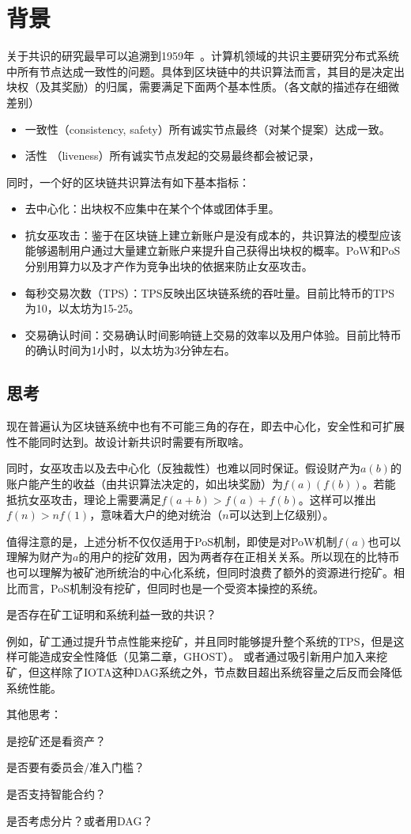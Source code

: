 \section{背景}
关于共识的研究最早可以追溯到1959年~\cite{eisenberg1959consensus}。计算机领域的共识主要研究分布式系统中所有节点达成一致性的问题。具体到区块链中的共识算法而言，其目的是决定出块权（及其奖励）的归属，需要满足下面两个基本性质。（各文献的描述存在细微差别）

\begin{itemize}
\item 一致性（consistency, safety）所有诚实节点最终（对某个提案）达成一致。
\item 活性 （liveness）所有诚实节点发起的交易最终都会被记录，
\end{itemize}
同时，一个好的区块链共识算法有如下基本指标：
\begin{itemize}
\item 去中心化：出块权不应集中在某个个体或团体手里。
\item 抗女巫攻击：鉴于在区块链上建立新账户是没有成本的，共识算法的模型应该能够遏制用户通过大量建立新账户来提升自己获得出块权的概率。PoW和PoS分别用算力以及才产作为竞争出块的依据来防止女巫攻击。
\item 每秒交易次数（TPS）：TPS反映出区块链系统的吞吐量。目前比特币的TPS为10，以太坊为15-25。
\item 交易确认时间：交易确认时间影响链上交易的效率以及用户体验。目前比特币的确认时间为1小时，以太坊为3分钟左右。
\end{itemize}

\subsection{思考}
现在普遍认为区块链系统中也有不可能三角的存在，即去中心化，安全性和可扩展性不能同时达到。故设计新共识时需要有所取啥。

同时，女巫攻击以及去中心化（反独裁性）也难以同时保证。假设财产为$a(b)$的账户能产生的收益（由共识算法决定的，如出块奖励）为$f(a)(f(b))$。若能抵抗女巫攻击，理论上需要满足$f(a+b)>f(a)+f(b)$。这样可以推出$f(n)>nf(1)$，意味着大户的绝对统治（$n$可以达到上亿级别）。

值得注意的是，上述分析不仅仅适用于PoS机制，即使是对PoW机制$f(a)$也可以理解为财产为$a$的用户的挖矿效用，因为两者存在正相关关系。所以现在的比特币也可以理解为被矿池所统治的中心化系统，但同时浪费了额外的资源进行挖矿。相比而言，PoS机制没有挖矿，但同时也是一个受资本操控的系统。

{\color{red}是否存在矿工证明和系统利益一致的共识？}

例如，矿工通过提升节点性能来挖矿，并且同时能够提升整个系统的TPS，但是这样可能造成安全性降低（见第二章，GHOST）。 或者通过吸引新用户加入来挖矿，但这样除了IOTA这种DAG系统之外，节点数目超出系统容量之后反而会降低系统性能。

其他思考：

是挖矿还是看资产？

是否要有委员会/准入门槛？

是否支持智能合约？

是否考虑分片？或者用DAG？


